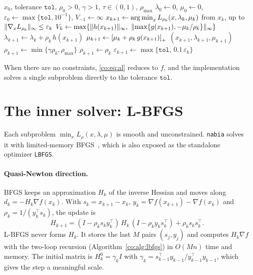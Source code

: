 \begin{algorithm}[ht]
\caption{Augmented Lagrangian (PHR) with L-BFGS inner solver}\label{co:alg:al}
\begin{algorithmic}[1]
\Require $x_0$, tolerance $\texttt{tol}$, $\rho_0>0$, $\gamma>1$, $\tau\in(0,1)$, $\rho_{\max}$
\State $\lambda_0\gets 0$, $\mu_0\gets 0$, $\varepsilon_0 \gets \max\{\texttt{tol},10^{-1}\}$, $V_{-1}\gets\infty$
  \State $x_{k+1}\gets\operatorname*{arg\,min}_x L_{\rho_k}(x,\lambda_k,\mu_k)$ from $x_k$, up to $\lVert \nabla_x L_{\rho_k}\rVert_\infty\le\varepsilon_k$ 
  \State $V_k \gets \max\{\norm{h(x_{k+1})}_\infty,\ \norm{\max\{g(x_{k+1}),-\mu_k/\rho_k\}}_\infty\}$
  \State $\lambda_{k+1}\gets\lambda_k+\rho_k\,h(x_{k+1})$
  \State $\mu_{k+1}\gets\left[\mu_k+\rho_k\,g(x_{k+1})\right]_+$
    \State \Return $(x_{k+1},\lambda_{k+1},\mu_{k+1})$ 
  \EndIf
    \State $\rho_{k+1}\gets\min\{\gamma\rho_k,\rho_{\max}\}$
  \Else
    \State $\rho_{k+1}\gets\rho_k$
  \EndIf
  \State $\varepsilon_{k+1}\gets\max\{\texttt{tol},\,0.1\,\varepsilon_k\}$
\EndFor
\end{algorithmic}
\end{algorithm}

When there are no constraints, \eqref{co:eq:al} reduces to $f$, and the
implementation solves a single subproblem directly to the tolerance
$\texttt{tol}$.

\section{The inner solver: L-BFGS}\label{co:sec:lbfgs}

Each subproblem $\min_x L_{\rho}(x,\lambda,\mu)$ is smooth and unconstrained.
\texttt{nabia} solves it with limited-memory BFGS~\cite{nocedal1980,liu1989},
which is also exposed as the standalone optimizer \texttt{LBFGS}.

\paragraph{Quasi-Newton direction.}
BFGS keeps an approximation $H_k$ of the inverse Hessian and moves along
$d_k=-H_k\nabla f(x_k)$. With $s_k=x_{k+1}-x_k$, $y_k=\nabla f(x_{k+1})-\nabla f(x_k)$
and $\rho_k=1/(y_k^\top s_k)$, the update is
\[
  H_{k+1} = (I-\rho_k s_k y_k^\top)\,H_k\,(I-\rho_k y_k s_k^\top) + \rho_k s_k s_k^\top .
\]
L-BFGS never forms $H_k$. It stores the last $M$ pairs $(s_j,y_j)$ and computes
$H_k\nabla f$ with the two-loop recursion (Algorithm~\ref{co:alg:lbfgs}) in
$O(Mn)$ time and memory. The initial matrix is
$H_k^0=\gamma_k I$ with $\gamma_k = s_{k-1}^\top y_{k-1}/y_{k-1}^\top y_{k-1}$,
which gives the step a meaningful scale.

